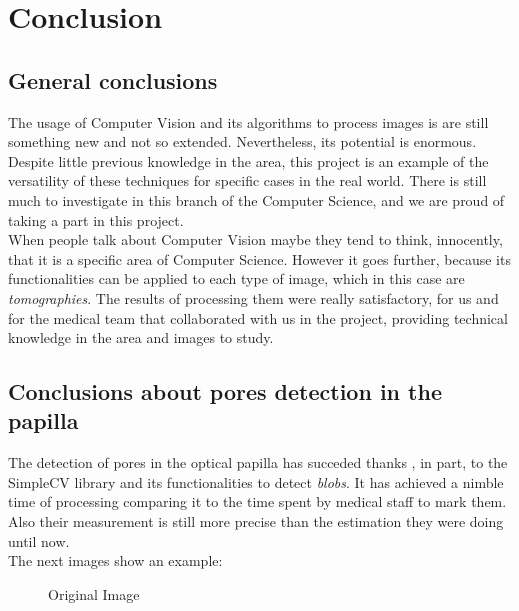 \chapter{Conclusion}
\section{General conclusions}
The usage of Computer Vision and its algorithms to process images is are
still something new and not so extended. Nevertheless, its potential is
enormous. Despite little previous knowledge in the area, this project is an
example of the versatility of these techniques for specific cases in
the real world. There is still much to investigate in this branch
of the Computer Science, and we are proud of taking a part in this
project.\\
When people talk about Computer Vision maybe they tend to think,
innocently, that it is a specific area of Computer Science. However
it goes further, because its functionalities can be applied to each
type of image, which in this case are \emph{tomographies}.
The results of processing them were really satisfactory, for us and
for the medical team that collaborated with us in the project, 
providing technical knowledge in the area and images to study.

\section{Conclusions about pores detection in the papilla}
The detection of pores in the optical papilla has succeded thanks
, in part, to the SimpleCV library and its functionalities to detect 
\emph{blobs}. It has achieved a nimble time of processing comparing
it to the time spent by medical staff to mark them. Also their 
measurement is still more precise than the estimation they were doing
until now. \\
The next images show an example:

    \begin{figure}[H]
      \caption{Original Image}
      \centering \setlength\fboxsep{0pt} \setlength\fboxrule{0.5pt}
    \end{figure}

